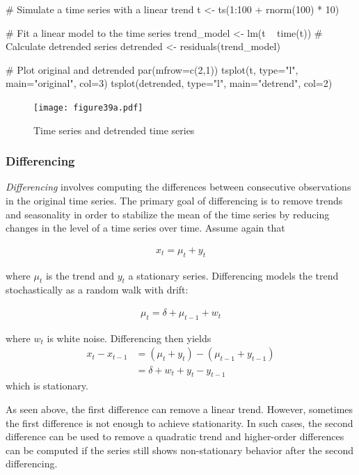 \begin{samepage}
\begin{Rcode}
# Simulate a time series with a linear trend
t <- ts(1:100 + rnorm(100) * 10)

# Fit a linear model to the time series
trend_model <- lm(t ~ time(t))
# Calculate detrended series
detrended <- residuals(trend_model)

# Plot original and detrended
par(mfrow=c(2,1))
tsplot(t, type="l", main="original", col=3)
tsplot(detrended, type="l", main="detrend", col=2)
\end{Rcode}
\end{samepage}

\begin{figure}
\centering
\texttt{[image: figure39a.pdf]}
\caption{Time series and detrended time series}
\label{fig:figure39a}
\end{figure}

\subsubsection*{Differencing}

\emph{Differencing} involves computing the differences between consecutive observations in the original time series. The primary goal of differencing is to remove trends and seasonality in order to stabilize the mean of the time series by reducing changes in the level of a time series over time. Assume again that 

\begin{align*}x_t = \mu_t + y_t\end{align*}

\noindent where $\mu_t$ is the trend and $y_t$ a stationary series. Differencing models the trend stochastically as a random walk with drift: 

\begin{align*}\mu_t = \delta + \mu_{t-1} + w_t\end{align*}

\noindent where $w_t$ is white noise. Differencing then yields 
\begin{align*}
x_t - x_{t-1} &= (\mu_t + y_t) - (\mu_{t-1} + y_{t-1}) \\
 &= \delta + w_t + y_t - y_{t-1}
 \end{align*}
\noindent which is stationary.

As seen above, the first difference can remove a linear trend. However, sometimes the first difference is not enough to achieve stationarity. In such cases, the second difference can be used to remove a quadratic trend and higher-order differences can be computed if the series still shows non-stationary behavior after the second differencing.

